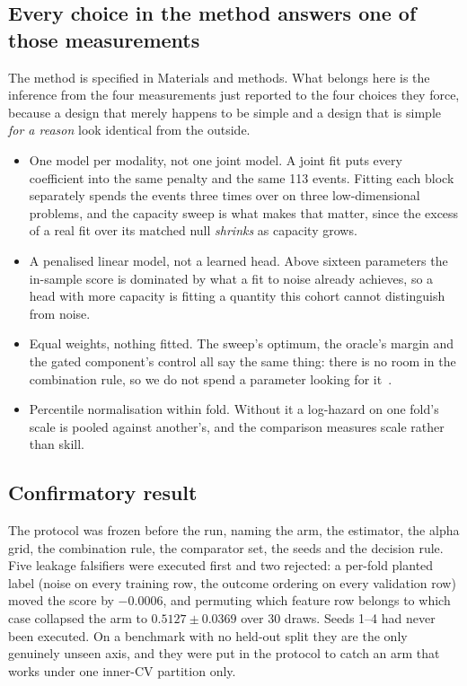 \documentclass[unnumsec,webpdf,contemporary,large]{oup-authoring-template}
\begin{document}
\subsection{Every choice in the method answers one of those measurements}

The method is specified in Materials and methods. What belongs here is the inference from the four
measurements just reported to the four choices they force, because a design that merely happens to
be simple and a design that is simple \emph{for a reason} look identical from the outside.

\begin{itemize}
  \item One model per modality, not one joint model. A joint fit puts every coefficient
    into the same penalty and the same 113 events. Fitting each block separately spends the events
    three times over on three low-dimensional problems, and the capacity sweep is what makes that
    matter, since the excess of a real fit over its matched null \emph{shrinks} as capacity grows.
  \item A penalised linear model, not a learned head. Above sixteen parameters the
    in-sample score is dominated by what a fit to noise already achieves, so a head with more
    capacity is fitting a quantity this cohort cannot distinguish from noise.
  \item Equal weights, nothing fitted. The sweep's optimum, the oracle's margin and the
    gated component's control all say the same thing: there is no room in the combination rule, so
    we do not spend a parameter looking for it~\citep{bates1969combination}.
  \item Percentile normalisation within fold. Without it a log-hazard on one fold's scale
    is pooled against another's, and the comparison measures scale rather than skill.
\end{itemize}

\subsection{Confirmatory result}

The protocol was frozen before the run, naming the
arm, the estimator, the alpha grid, the combination rule, the comparator set, the seeds and the
decision rule. Five leakage falsifiers were executed first and two rejected: a per-fold planted
label (noise on every training row, the outcome ordering on every validation row) moved the
score by $-0.0006$, and permuting which feature row belongs to which case collapsed the arm to
$0.5127 \pm 0.0369$ over 30 draws. Seeds 1--4 had never been executed. On a benchmark with no
held-out split they are the only genuinely unseen axis, and they were put in the protocol to catch
an arm that works under one inner-CV partition only.
\end{document}
